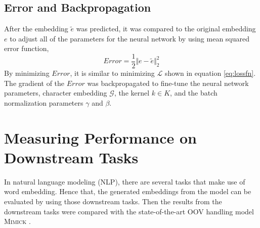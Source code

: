     \subsection{Error and Backpropagation}
        After the embedding $\tilde{e}$ was predicted, it was
        compared to the original embedding $e$ to adjust all of the
        parameters for the neural network by using mean squared error
        function,
        \begin{equation}
            \label{eq:errorf}
            Error = \frac{1}{2} \Vert e - \tilde{e} \Vert ^{2}_2
        \end{equation}
        By minimizing $Error$, it is similar to minimizing
        $\mathcal{L}$ shown in equation \ref{eq:lossfn}. The gradient
        of the $Error$ was backpropagated to fine-tune the neural
        network parameters, character embedding $\mathcal{G}$, the
        kernel $k \in K$, and the batch normalization parameters
        $\gamma$ and $\beta$.
        
\section{Measuring Performance on Downstream Tasks}
    In natural language modeling (NLP), there are several tasks that
    make use of word embedding. Hence that, the generated embeddings
    from the model can be evaluated by using those downstream tasks.
    Then the results from the downstream tasks were compared with the
    state-of-the-art OOV handling model \textsc{Mimick}
    \citep{mimicking2017Pinter}.
    
